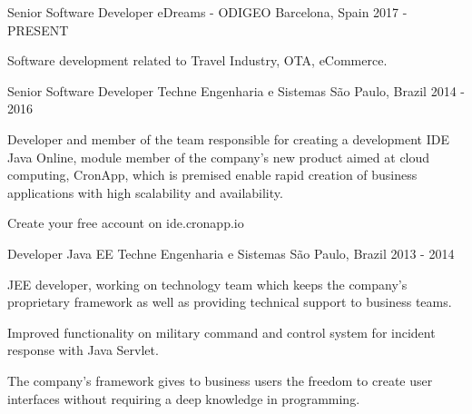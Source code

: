 

\begin{cventries}

  \cventry
    {Senior Software Developer} %
    {eDreams - ODIGEO} %
    {Barcelona, Spain} %
    {2017 - PRESENT} %
    {
      \begin{cvitems} %
        \item {Software development related to Travel Industry, OTA, eCommerce.}
      \end{cvitems}
    }

  \cventry
    {Senior Software Developer} %
    {Techne Engenharia e Sistemas} %
    {São Paulo, Brazil} %
    {2014 - 2016} %
    {
      \begin{cvitems} %
        \item {Developer and member of the team responsible for creating a development IDE Java Online, module member of the company's new product aimed at cloud computing, CronApp, which is premised enable rapid creation of business applications with high scalability and availability.}
        \item {Create your free account on ide.cronapp.io}
      \end{cvitems}
    }

  \cventry
    {Developer Java EE} %
    {Techne Engenharia e Sistemas} %
    {São Paulo, Brazil} %
    {2013 - 2014} %
    {
      \begin{cvitems} %
        \item {JEE developer, working on technology team which keeps the company's proprietary framework as well as providing technical support to business teams.}
        \item {Improved functionality on military command and control system for incident response with Java Servlet.}
        \item {The company's framework gives to business users the freedom to create user interfaces without requiring a deep knowledge in programming.}
      \end{cvitems}
    }


\end{cventries}

